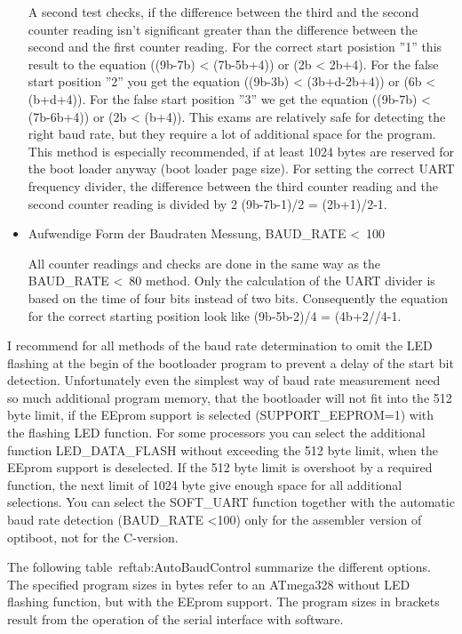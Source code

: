\begin{itemize}
A second test checks, if the difference between the third and the
second counter reading isn't significant greater than the difference
between the second and the first counter reading.
For the correct start posistion ''1'' this result to the equation ((9b-7b) < (7b-5b+4))
or (2b < 2b+4).
For the false start position ''2'' you get the equation ((9b-3b) < (3b+d-2b+4)) or
(6b < (b+d+4)).
For the false start position ''3'' we get the equation ((9b-7b) < (7b-6b+4)) or (2b < (b+4)).
This exams are relatively safe for detecting the right baud rate, but they
require a lot of additional space for the program.
This method is especially recommended, if at least 1024 bytes are reserved
for the boot loader anyway (boot loader page size).
For setting the correct UART frequency divider, the difference between 
the third counter reading and the second counter reading is divided by 2
(9b-7b-1)/2 = (2b+1)/2-1.

\item {Aufwendige Form der Baudraten Messung, BAUD\_RATE \textless~100}

All counter readings and checks are done in the same way as the
BAUD\_RATE \textless~80 method. Only the calculation of
the UART divider is based on the time of four bits instead of two bits.
Consequently the equation for the correct starting position
look like (9b-5b-2)/4 = (4b+2//4-1.

\end{itemize}

I recommend for all methods of the baud rate determination to omit
the LED flashing at the begin of the bootloader program
to prevent a delay of the start bit detection.
Unfortunately even the simplest way of baud rate measurement
need so much additional program memory, that the bootloader
will not fit into the 512 byte limit, if the EEprom support
is selected (SUPPORT\_EEPROM=1) with the flashing LED function.
For some processors you can select the additional function LED\_DATA\_FLASH
without exceeding the 512 byte limit, when the EEprom support is deselected.
If the 512 byte limit is overshoot by a required function,
the next limit of 1024 byte give enough space for all additional
selections.
You can select the SOFT\_UART function together with the automatic
baud rate detection (BAUD\_RATE \textless 100) only for the
assembler version of optiboot, not for the C-version.

The following table~ref{tab:AutoBaudControl} summarize the different options.
The specified program sizes in bytes refer to an ATmega328 without LED flashing function,
but with the EEprom support.
The program sizes in brackets result from the operation of the serial interface with software.


